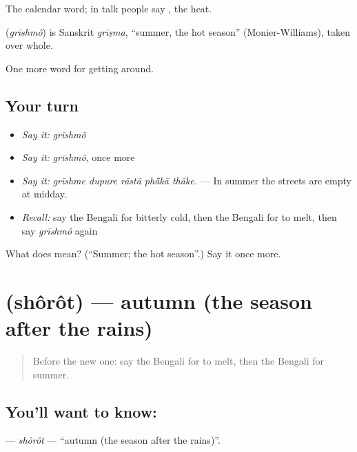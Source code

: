 The calendar word; in talk people say , the heat.

\begin{cousinweb}
\textbf{} (\emph{grīshmô}) is Sanskrit \emph{grīṣma}, \textquotedblleft{}summer, the hot season\textquotedblright{} (Monier-Williams), taken over whole.
\end{cousinweb}

\begin{grammarlens}[title={What you've built}]
One more word for getting around.
\end{grammarlens}

\subsection*{Your turn}
\begin{itemize}
\raggedright
  \item \emph{Say it:} \emph{grīshmô}
  \item \emph{Say it:} \emph{grīshmô}, once more
  \item \emph{Say it:} \emph{grīshme dupure rāstā phā̃kā thāke.} — In summer the streets are empty at midday.
  \item \emph{Recall:} say the Bengali for bitterly cold, then the Bengali for to melt, then say \emph{grīshmô} again
\end{itemize}

\begin{tcolorbox}[breakable,colback=teal!4,colframe=teal!35!black,title={Before you move on}]
What does  mean? (\textquotedblleft{}Summer; the hot season\textquotedblright{}.) Say it once more.
\end{tcolorbox}
\section[\texorpdfstring{\bn{শরৎ} (shôrôt)}{শরৎ (shôrôt)}]{ (shôrôt) — autumn (the season after the rains)}

\label{lesson:BN-C427-shorot}



\begin{quote}
Before the new one: say the Bengali for to melt, then the Bengali for summer.
\end{quote}

\subsection*{You'll want to know: }
\textbf{} — \emph{shôrôt} — \textquotedblleft{}autumn (the season after the rains)\textquotedblright{}.

